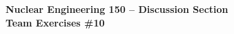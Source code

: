 \documentclass{report}
\begin{document}
\begin{center}
\textbf{\large Nuclear Engineering 150 -- Discussion Section}\\ 
\textbf{Team Exercises \#10}
\end{center}


\newpage



\end{document}
